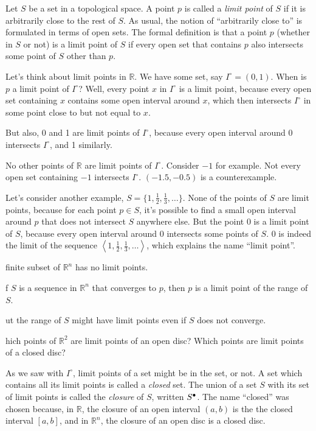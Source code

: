 \documentclass{article}
\def\R{{\mathbb R}}
\def\Rn{{\R^n}}
\newcounter{exercisecounter}\setcounter{exercisecounter}{1}
\def\Exercise.#1\par{{\item\small {\bf Exercise \number\theexercisecounter}.#1\addtocounter{exercisecounter}{1}}}
\def\clos#1{\smash{#1}^\bullet\vphantom{#1}}
\begin{document}
Let $S$ be a set in a topological space.  A point $p$ is called a {\em
  limit point\/} of $S$ if it is arbitrarily close to the rest of $S$.
As usual, the notion of ``arbitrarily close to'' is formulated in
terms of open sets.  The formal definition is that a point $p$
(whether in $S$ or not) is a limit point of $S$ if every open set that
contains $p$ also intersects some point of $S$ other than $p$.

Let's think about limit points in $\R$.  We have some set, say
$I^\circ = (0,1)$.  When is $p$ a limit point of $I^\circ$?  Well, every point
$x$ in $I^\circ$ is a limit point, because every open set containing
$x$ contains some open interval around $x$, which then intersects
$I^\circ$ in some point close to but not equal to $x$.

But also, 0 and 1 are limit points of $I^\circ$, because every open
interval around 0 intersects $I^\circ$, and 1 similarly.

No other points of $\R$ are limit points of $I^\circ$.  Consider $-1$
for example.  Not every open set containing $-1$ intersects $I^\circ$.
$(-1.5, -0.5)$ is a counterexample.


Let's consider another example, $S = \{1, \frac12, \frac13, \ldots\}$. 
None of the points of $S$ are limit points, because for each
point $p\in S$, it's possible to find a small open interval around $p$
that does not intersect $S$ anywhere else.  But the point 0 is a limit
point of $S$, because every open interval around 0 intersects some
points of $S$.  0 is indeed the limit of the sequence $\left< 1, \frac12,
\frac13, \ldots\right>$, which explains the name ``limit point''.

\begin{itemize}
\Exercise. A finite subset of $\R^n$ has no limit points.

\Exercise. If $S$ is a sequence in $\Rn$ that converges to $p$, then $p$
is a limit point of the range of $S$.

\Exercise. But the range of $S$ might have limit points even if $S$ does not converge.

\Exercise. Which points of $\R^2$ are limit points of an open disc?
Which points are limit points of a closed disc?

\end{itemize}

As we saw with $I^\circ$, limit points of a set might be in the set,
or not.  A set which contains all its limit points is called a {\em
  closed\/} set.  The union of a set $S$ with its set of limit points
is called the {\em closure\/} of $S$, written $\clos S$.  The name
``closed'' was chosen because, in $\R$, the closure of an open interval
$(a, b)$ is the the closed interval $[a, b]$, and in $\Rn$, the closure of
an open disc is a closed disc.
\end{document}
